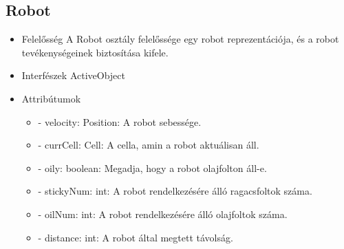 \subsection{Robot}
\begin{itemize}
	\item Felelősség\newline
	A Robot osztály felelőssége egy robot reprezentációja, és a robot tevékenységeinek biztosítása kifele.
	
	\item Interfészek\newline
	ActiveObject
	\item Attribútumok
	\begin{itemize}
		\item - velocity: Position: A robot sebessége.
		\item - currCell: Cell: A cella, amin a robot aktuálisan áll.
		\item - oily: boolean: Megadja, hogy a robot olajfolton áll-e.
		\item - stickyNum: int: A robot rendelkezésére álló ragacsfoltok száma.
		\item - oilNum: int: A robot rendelkezésére álló olajfoltok száma.
		\item - distance: int: A robot által megtett távolság.
		

\end{itemize}
\end{itemize}
